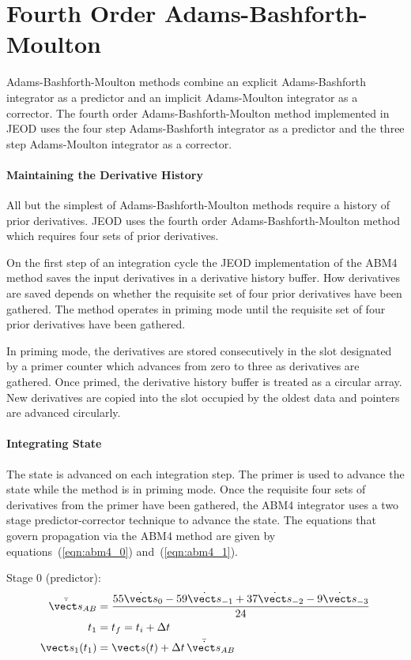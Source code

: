 \chapter{Fourth Order Adams-Bashforth-Moulton}\label{app:abm4}

Adams-Bashforth-Moulton methods combine an explicit Adams-Bashforth
integrator as a predictor and an implicit Adams-Moulton integrator
as a corrector. The fourth order Adams-Bashforth-Moulton method
implemented in JEOD uses the four step Adams-Bashforth integrator
as a predictor and the three step Adams-Moulton integrator as a corrector.

\subsubsection{Maintaining the Derivative History}
All but the simplest of Adams-Bashforth-Moulton methods require a history
of prior derivatives. JEOD uses the fourth order Adams-Bashforth-Moulton method
which requires four sets of prior derivatives.

On the first step of an integration cycle the JEOD implementation of the
ABM4 method saves the input derivatives in a derivative history buffer.
How derivatives are saved depends on whether the requisite set of four prior
derivatives have been gathered. The method operates in priming mode until the
requisite set of four prior derivatives have been gathered.

In priming mode, the derivatives are stored consecutively in the slot designated
by a primer counter which advances from zero to three as derivatives are
gathered. Once primed, the derivative history buffer is treated as a circular
array. New derivatives are copied into the slot occupied by the oldest data
and pointers are advanced circularly.

\subsubsection{Integrating State}
The state is advanced on each integration step. The primer is used to
advance the state while the method is in priming mode.
Once the requisite four sets of derivatives from the primer have been gathered,
the ABM4 integrator uses a two stage predictor-corrector technique to advance
the state.
The equations that govern propagation via the ABM4 method are given by
equations~(\ref{eqn:abm4_0}) and~(\ref{eqn:abm4_1})\cite{hamming:1986}.

Stage 0 (predictor):
\begin{equation}
\label{eqn:abm4_0}
\begin{split}
\bar {\dot{\vect s}}_{AB} &=
  \frac{55\dot{\vect s}_0 - 59\dot{\vect s}_{-1} +
        37\dot{\vect s}_{-2} - 9\dot{\vect s}_{-3}} {24} \\
t_1 &= t_f = t_i + \Delta t \\
\vect s_1(t_1) &= \vect s(t) + \Delta t \, \bar {\dot{\vect s}}_{AB}
\end{split}
\end{equation}

